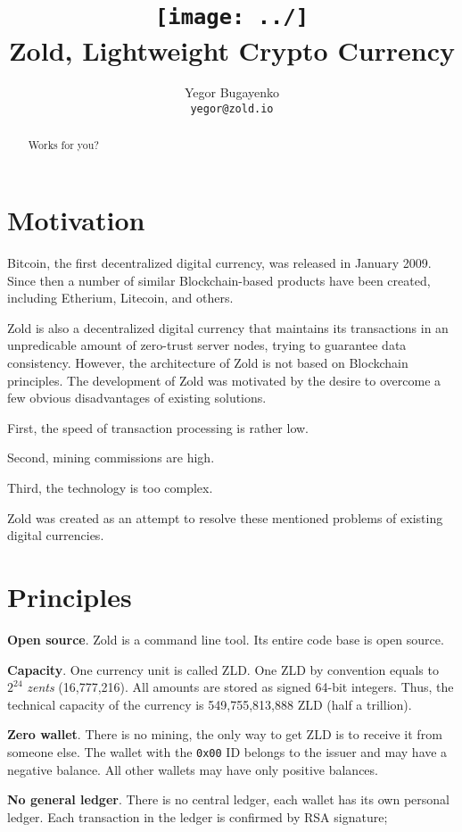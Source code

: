 \documentclass[11pt,oneside]{article}
\title{\texttt{[image: ../]}\\Zold, Lightweight Crypto Currency}
\author{Yegor Bugayenko\\\texttt{yegor@zold.io}}
\newcommand\dd[1]{\colorbox{gray!30}{\texttt{#1}}}
\begin{document}
\raggedbottom
\maketitle
\begin{abstract}
Works for you?
\end{abstract}

\section{Motivation}

Bitcoin, the first decentralized digital currency, was released in
January 2009. Since then a number of similar Blockchain-based products have been
created, including Etherium, Litecoin, and others.

Zold is also a decentralized digital currency that maintains its transactions
in an unpredicable amount of zero-trust server nodes, trying to guarantee
data consistency. However, the architecture of Zold is not based on Blockchain
principles. The development of Zold was motivated by the desire to overcome
a few obvious disadvantages of existing solutions.

First, the speed of transaction processing is rather low.

Second, mining commissions are high.

Third, the technology is too complex.

Zold was created as an attempt to resolve these mentioned problems
of existing digital currencies.

\section{Principles}

\textbf{Open source}.
Zold is a command line tool. Its entire code base is open source.

\textbf{Capacity}.
One currency unit is called ZLD.
One ZLD by convention equals to $2^{24}$ \emph{zents} (16,777,216).
All amounts are stored as signed 64-bit integers.
Thus, the technical capacity of the currency is 549,755,813,888 ZLD (half a trillion).

\textbf{Zero wallet}.
There is no mining, the only way to get ZLD is to receive it from someone else.
The wallet with the \dd{0x00} ID belongs to the
issuer and may have a negative balance. All other wallets
may have only positive balances.

\textbf{No general ledger}.
There is no central ledger, each wallet has its own personal ledger.
Each transaction in the ledger is confirmed by RSA signature;
\end{document}
